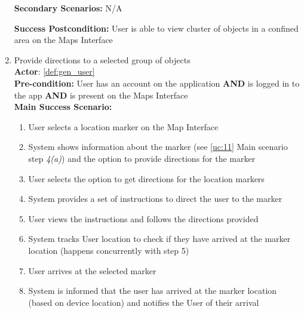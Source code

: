 \documentclass{article}
\begin{document}
\begin{enumerate}[label=\textbf{UC\arabic*}]
          \textbf{Secondary Scenarios:}
          N/A

          \textbf{Success Postcondition:} User is able to view cluster of objects in a confined area on the Maps Interface

    \item \label{uc:12}  Provide directions to a selected group of objects \\
          \textbf{Actor}: \ref{def:gen_user} \\
          \textbf{Pre-condition:} User has an account on the application \textbf{AND} is logged in to the app \textbf{AND} is present on the Maps Interface \\

          \textbf{Main Success Scenario:}
          \begin{enumerate}[label=\textbf{\arabic*.}]
              \item User selects a location marker on the Map Interface
              \item System shows information about the marker (see \ref{uc:11} Main scenario step \textit{4(a)}) and the option to provide directions for the marker
              \item User selects the option to get directions for the location markers
              \item System provides a set of instructions to direct the user to the marker
              \item User views the instructions and follows the directions provided
              \item System tracks User location to check if they have arrived at the marker location (happens concurrently with step 5)
              \item User arrives at the selected marker
              \item System is informed that the user has arrived at the marker location (based on device location) and notifies the User of their arrival
          \end{enumerate}


\end{enumerate}
\end{document}
